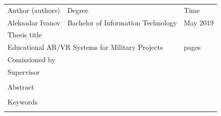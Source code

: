 \documentclass[12pt, a4paper,oneside, nocenter]{thesis}
\newcommand\blankpage{%
    \null
    \thispagestyle{empty}%
    \addtocounter{page}{-1}%
    \newpage}
\begin{document}
    \thispagestyle{empty}
    \noindent
    \begin{tabularx}{\linewidth}{|XXXX|}
      \hline
	   Author (authors) &  Degree &  & Time \\
	   Aleksadar Ivanov &  \multicolumn{2}{l}{Bachelor of Information Technology} & May 2019 \\
	   \hline
	   Thesis title & & & \\
	   \multicolumn{3}{|l}{Educational AR/VR Systems for Military Projects} & \pageref{LastPage} pages\\
	  \hline
	  Comissioned by & & & \\
	  \hline
	  Supervisor & & & \\
	  & & & \\
	  \hline
	  Abstract & & & \\
	  & & & \\
	  \hline
	  Keywords & & & \\
	  & & & \\
	  \hline
    \end{tabularx}

\newpage%
{
\tableofcontents
}

\newpage%



\end{document}
